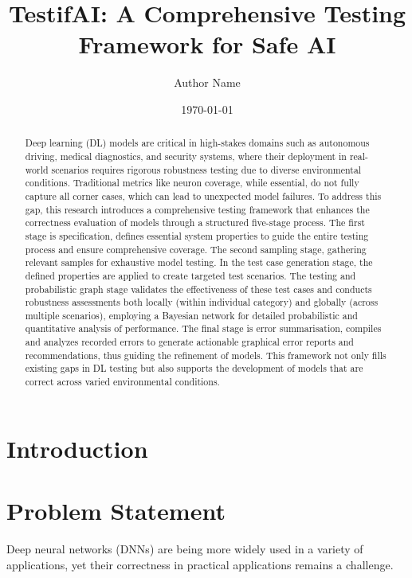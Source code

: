 \documentclass[10pt, conference, a4paper, final]{IEEEtran}
\title{TestifAI: A Comprehensive Testing Framework for Safe AI}
\author{Author Name}
\date{\today}
\begin{document}
\maketitle

\begin{abstract}

    Deep learning (DL) models are critical in high-stakes domains such as autonomous driving, medical diagnostics, and security systems, where their deployment in real-world scenarios requires rigorous robustness testing due to diverse environmental conditions. Traditional metrics like neuron coverage, while essential, do not fully capture all corner cases, which can lead to unexpected model failures. To address this gap, this research introduces a comprehensive testing framework that enhances the correctness evaluation of models through a structured five-stage process. The first stage is specification, defines essential system properties to guide the entire testing process and ensure comprehensive coverage. The second sampling stage, gathering relevant samples for exhaustive model testing. In the test case generation stage, the defined properties are applied to create targeted test scenarios. The testing and probabilistic graph stage validates the effectiveness of these test cases and conducts robustness assessments both locally (within individual category) and globally (across multiple scenarios), employing a Bayesian network for detailed probabilistic and quantitative analysis of performance. The final stage is error summarisation, compiles and analyzes recorded errors to generate actionable graphical error reports and recommendations, thus guiding the refinement of models. This framework not only fills existing gaps in DL testing but also supports the development of models that are correct across varied environmental conditions.
\end{abstract}


\section{Introduction}

\section{Problem Statement}

Deep neural networks (DNNs) are being more widely used in a variety of applications, yet their correctness in practical applications remains a challenge.
\end{document}
